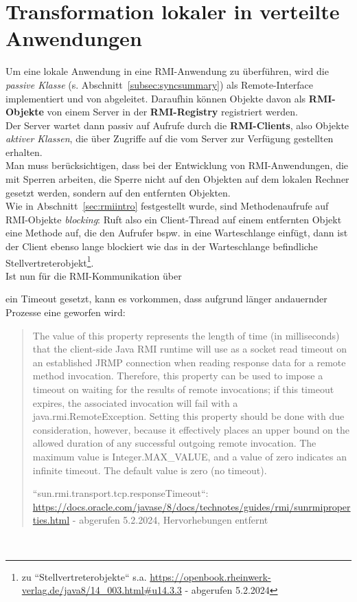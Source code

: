 \section{Transformation lokaler in verteilte Anwendungen}

Um eine lokale Anwendung in eine RMI-Anwendung zu überführen, wird die \textit{passive Klasse} (s. Abschnitt~\ref{subsec:syncsummary}) als Remote-Interface implementiert und von  abgeleitet.
Daraufhin können Objekte davon als \textbf{RMI-Objekte} von einem Server in der \textbf{RMI-Registry} registriert werden.\\

\noindent
Der Server wartet dann passiv auf Aufrufe durch die \textbf{RMI-Clients}, also Objekte \textit{aktiver Klassen}, die über  Zugriffe auf die vom Server zur Verfügung gestellten  erhalten.\\

\noindent
Man muss berücksichtigen, dass bei der Entwicklung von RMI-Anwendungen, die mit Sperren arbeiten, die Sperre nicht auf den Objekten auf dem lokalen Rechner gesetzt werden, sondern auf den entfernten Objekten. \\
Wie in Abschnitt~\ref{sec:rmiintro} festgestellt wurde, sind Methodenaufrufe auf RMI-Objekte \textit{blocking}: Ruft also ein Client-Thread auf einem entfernten Objekt eine Methode auf, die den Aufrufer bspw. in eine Warteschlange einfügt, dann ist der Client ebenso lange blockiert wie das in der Warteschlange befindliche Stellvertreterobjekt\footnote{
zu ``Stellvertreterobjekte`` s.a. \url{https://openbook.rheinwerk-verlag.de/java8/14_003.html#u14.3.3} - abgerufen 5.2.2024
}.\\
Ist nun für die RMI-Kommunikation über \begin{center}\end{center} ein Timeout gesetzt, kann es vorkommen, dass aufgrund länger andauernder Prozesse eine  geworfen wird:

\blockquote[{``sun.rmi.transport.tcp.responseTimeout``: \url{https://docs.oracle.com/javase/8/docs/technotes/guides/rmi/sunrmiproperties.html} - abgerufen 5.2.2024, Hervorhebungen entfernt}]{
    The value of this property represents the length of time (in milliseconds) that the client-side Java RMI runtime will use as a socket read timeout on an established JRMP connection when reading response data for a remote method invocation. Therefore, this property can be used to impose a timeout on waiting for the results of remote invocations; if this timeout expires, the associated invocation will fail with a java.rmi.RemoteException. Setting this property should be done with due consideration, however, because it effectively places an upper bound on the allowed duration of any successful outgoing remote invocation. The maximum value is Integer.MAX\_VALUE, and a value of zero indicates an infinite timeout. The default value is zero (no timeout).
}\\

